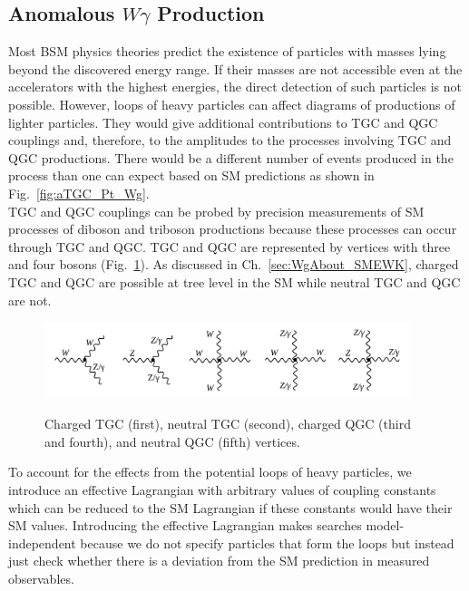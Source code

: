 \subsection{Anomalous $W\gamma$ Production}
\label{sec:WgAbout_ATGC}

Most BSM physics theories predict the existence of particles with masses lying beyond the discovered energy range. If their masses are not accessible even at the accelerators with the highest energies, the direct detection of such particles is not possible. However, loops of heavy particles can affect diagrams of productions of lighter particles. They would give additional contributions to TGC and QGC couplings and, therefore, to the amplitudes to the processes involving TGC and QGC productions. There would be a different number of events produced in the process than one can expect based on SM predictions as shown in Fig.~\ref{fig:aTGC_Pt_Wg}.\\

TGC and QGC couplings can be probed by precision measurements of SM processes of diboson and triboson productions because these processes can occur through TGC and QGC. TGC and QGC are represented by vertices with three and four bosons (Fig.~\ref{fig:TGC_and_QGC_vertices}). As discussed in Ch.~\ref{sec:WgAbout_SMEWK}, charged TGC and QGC are possible at tree level in the SM while neutral TGC and QGC are not.\\ 

\begin{figure}[htb]
  \begin{center}
    {\includegraphics[width=0.95\textwidth]{../figs/WgAbout/TGC_and_QGC_vertices.png}}
    \caption{Charged TGC (first), neutral TGC (second), charged QGC (third and fourth), and neutral QGC (fifth) vertices.}
    \label{fig:TGC_and_QGC_vertices}
  \end{center}
\end{figure}

To account for the effects from the potential loops of heavy particles, we introduce an effective Lagrangian with arbitrary values of coupling constants which can be reduced to the SM Lagrangian if these constants would have their SM values. Introducing the effective Lagrangian makes searches model-independent because we do not specify particles that form the loops but instead just check whether there is a deviation from the SM prediction in measured observables. \\

